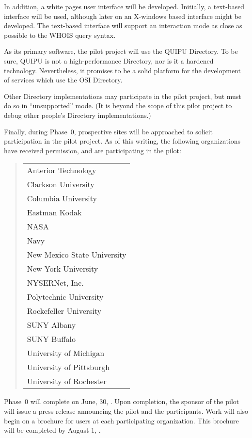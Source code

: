 In addition,
a white pages user interface will be developed.
Initially,
a text-based interface will be used,
although later on an X-windows based interface might be developed.
The text-based interface will support an interaction mode as close as
possible to the WHOIS query syntax.

As its primary software,
the pilot project will use the QUIPU Directory.
To be sure,
QUIPU is not a high-performance Directory,
nor is it a hardened technology.
Nevertheless,
it promises to be a solid platform for the development of services which use
the OSI Directory.

Other Directory implementations may participate in the pilot project,
but must do so in ``unsupported'' mode.
(It is beyond the scope of this pilot project to debug other people's Directory
implementations.)

Finally,
during Phase~0,
prospective sites will be approached to solicit participation in the
pilot project.
As of this writing,
the following organizations have received permission,
and are participating in the pilot:
\begin{quote}
\begin{tabular}{l}
Anterior Technology\\
Clarkson University\\
Columbia University\\
Eastman Kodak\\
NASA\\
Navy\\
New Mexico State University\\
New York University\\
NYSERNet, Inc.\\
Polytechnic University\\
Rockefeller University\\
SUNY Albany\\
SUNY Buffalo\\
University of Michigan\\
University of Pittsburgh\\
University of Rochester\\
\end{tabular}
\end{quote}

Phase~0 will complete on June, 30, {}.
Upon completion,
the sponsor of the pilot will issue a press release announcing the
pilot and the participants.
Work will also begin on a brochure for users at each participating
organization.
This brochure will be completed by August 1, {}.

